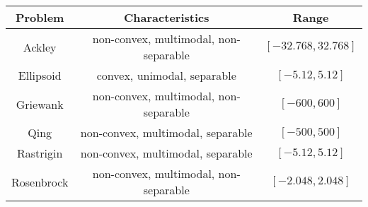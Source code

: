 \begin{tabular}{|c|c|c|}
\hline
Problem    & Characteristics                       & Range               \\ \hline
Ackley     & non-convex, multimodal, non-separable & $[-32.768, 32.768]$ \\ \hline
Ellipsoid  & convex, unimodal, separable           & $[-5.12, 5.12]$     \\ \hline
Griewank   & non-convex, multimodal, non-separable & $[-600, 600]$       \\ \hline
Qing       & non-convex, multimodal, separable     & $[-500, 500]$       \\ \hline
Rastrigin  & non-convex, multimodal, separable     & $[-5.12, 5.12]$     \\ \hline
Rosenbrock & non-convex, multimodal, non-separable & $[-2.048, 2.048]$   \\ \hline
\end{tabular}
